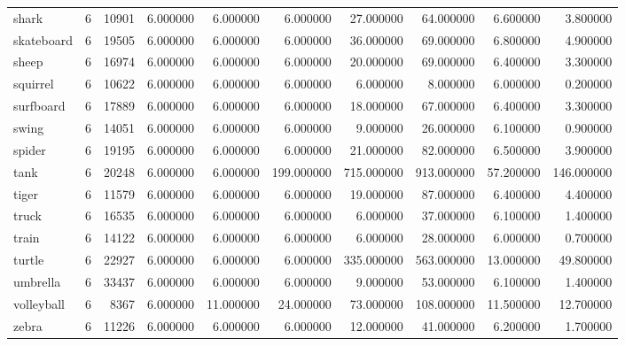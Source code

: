 \begin{tabular}{lrrrrrrrrr}
shark & 6 & 10901 & 6.000000 & 6.000000 & 6.000000 & 27.000000 & 64.000000 & 6.600000 & 3.800000 \\
skateboard & 6 & 19505 & 6.000000 & 6.000000 & 6.000000 & 36.000000 & 69.000000 & 6.800000 & 4.900000 \\
sheep & 6 & 16974 & 6.000000 & 6.000000 & 6.000000 & 20.000000 & 69.000000 & 6.400000 & 3.300000 \\
squirrel & 6 & 10622 & 6.000000 & 6.000000 & 6.000000 & 6.000000 & 8.000000 & 6.000000 & 0.200000 \\
surfboard & 6 & 17889 & 6.000000 & 6.000000 & 6.000000 & 18.000000 & 67.000000 & 6.400000 & 3.300000 \\
swing & 6 & 14051 & 6.000000 & 6.000000 & 6.000000 & 9.000000 & 26.000000 & 6.100000 & 0.900000 \\
spider & 6 & 19195 & 6.000000 & 6.000000 & 6.000000 & 21.000000 & 82.000000 & 6.500000 & 3.900000 \\
tank & 6 & 20248 & 6.000000 & 6.000000 & 199.000000 & 715.000000 & 913.000000 & 57.200000 & 146.000000 \\
tiger & 6 & 11579 & 6.000000 & 6.000000 & 6.000000 & 19.000000 & 87.000000 & 6.400000 & 4.400000 \\
truck & 6 & 16535 & 6.000000 & 6.000000 & 6.000000 & 6.000000 & 37.000000 & 6.100000 & 1.400000 \\
train & 6 & 14122 & 6.000000 & 6.000000 & 6.000000 & 6.000000 & 28.000000 & 6.000000 & 0.700000 \\
turtle & 6 & 22927 & 6.000000 & 6.000000 & 6.000000 & 335.000000 & 563.000000 & 13.000000 & 49.800000 \\
umbrella & 6 & 33437 & 6.000000 & 6.000000 & 6.000000 & 9.000000 & 53.000000 & 6.100000 & 1.400000 \\
volleyball & 6 & 8367 & 6.000000 & 11.000000 & 24.000000 & 73.000000 & 108.000000 & 11.500000 & 12.700000 \\
zebra & 6 & 11226 & 6.000000 & 6.000000 & 6.000000 & 12.000000 & 41.000000 & 6.200000 & 1.700000 \\
\bottomrule
\end{tabular}

